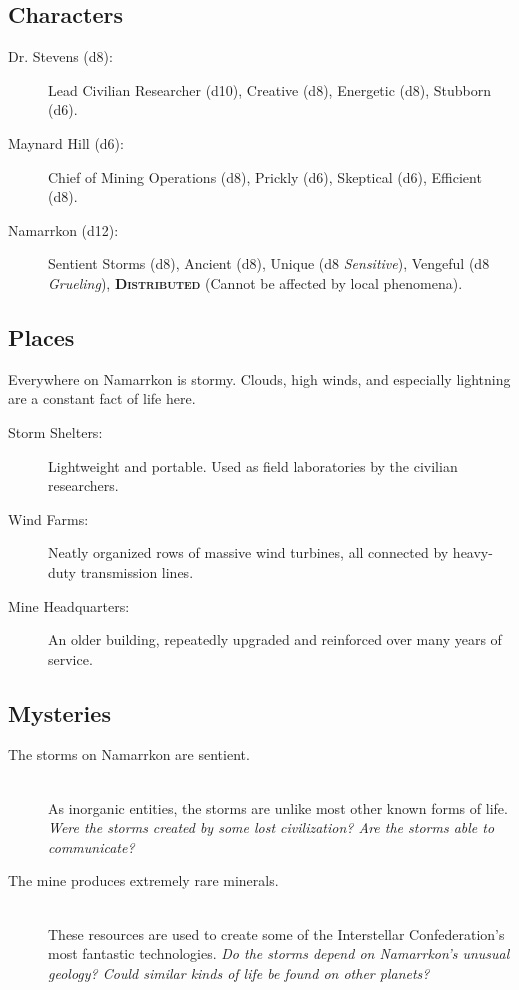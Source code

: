 \documentclass[11pt, a5paper, parskip=half-, DIV=12]{scrartcl}
\begin{document}
\newpage

\subsection*{Characters}
\begin{description}
	\item[Dr. Stevens (d8):] Lead Civilian Researcher (d10), Creative (d8),  Energetic (d8), Stubborn (d6).
	\item[Maynard Hill (d6):] Chief of Mining Operations (d8), Prickly (d6), Skeptical (d6), Efficient (d8).	
	\item[Namarrkon (d12):] Sentient Storms (d8), Ancient (d8), Unique (d8 \textit{Sensitive}), Vengeful (d8 \textit{Grueling}), \textsc{\textbf{Distributed}} (Cannot be affected by local phenomena).
\end{description}

\subsection*{Places}
Everywhere on Namarrkon is stormy.  Clouds, high winds, and especially lightning are a constant fact of life here.
\begin{description}
	\item[Storm Shelters:] Lightweight and portable. Used as field laboratories by the civilian researchers.
	\item[Wind Farms:] Neatly organized rows of massive wind turbines, all connected by heavy-duty transmission lines.
	\item[Mine Headquarters:] An older building, repeatedly upgraded and reinforced over many years of service.
\end{description}

\subsection*{Mysteries}
\begin{description}
	\item[The storms on Namarrkon are sentient.] \phantom{a} \\ 
	As inorganic entities, the storms are unlike most other known forms of life. \textit{Were the storms created by some lost civilization? Are the storms able to communicate?}
	\item[The mine produces extremely rare minerals.] \phantom{a} \\ These resources are used to create some of the Interstellar Confederation's most fantastic technologies. \textit{Do the storms depend on Namarrkon's unusual geology? Could similar kinds of life be found on other planets?}
\end{description}
\end{document}
